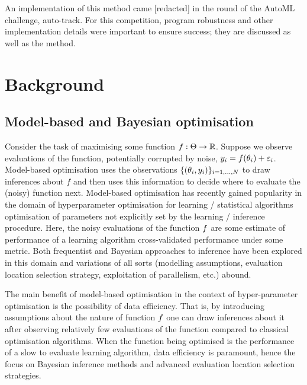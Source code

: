 \documentclass{article} %
\begin{document}

An implementation of this method came [redacted] in the  round of the AutoML challenge, auto-track.
For this competition, program robustness and other implementation details were important to ensure success; they are discussed as well as the method.

\section{Background}

\subsection{Model-based and Bayesian optimisation}

Consider the task of maximising some function ${f : \Theta \to \mathbb{R}}$.
Suppose we observe evaluations of the function, potentially corrupted by noise, ${y_i = f(\theta_i) + \varepsilon_i}$.
Model-based optimisation uses the observations ${\{(\theta_i, y_i)\}_{i=1,\dots,N}}$ to draw inferences about $f$ and then uses this information to decide where to evaluate the (noisy) function next.
Model-based optimisation has recently gained popularity in the domain of hyperparameter optimisation for learning / statistical algorithms \ie optimisation of parameters not explicitly set by the learning / inference procedure.
Here, the noisy evaluations of the function $f$ are some estimate of performance of a learning algorithm \eg cross-validated performance under some metric.
Both frequentist and Bayesian approaches to inference have been explored in this domain and variations of all sorts (modelling assumptions, evaluation location selection strategy, exploitation of parallelism, etc.) abound.

The main benefit of model-based optimisation in the context of hyper-parameter optimisation is the possibility of data efficiency.
That is, by introducing assumptions about the nature of function $f$ one can draw inferences about it after observing relatively few evaluations of the function compared to classical optimisation algorithms\footnotemark{}.
When the function being optimised is the performance of a slow to evaluate learning algorithm, data efficiency is paramount, hence the focus on Bayesian inference methods and advanced evaluation location selection strategies.
\end{document}
